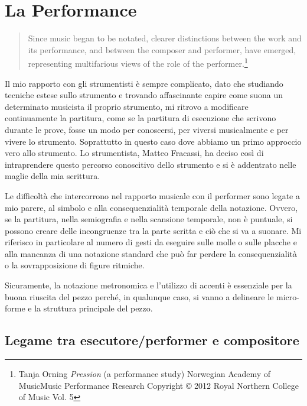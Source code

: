 
\chapter{La Performance}
\label{chp:La Performance}

\begin{quotation}
Since music began to be notated, clearer distinctions between the work and its performance, and between the composer and performer, have emerged, representing multifarious views of the role of the performer.\footnote{Tanja Orning \textit{Pression} (a performance study) Norwegian Academy of MusicMusic Performance Research Copyright © 2012 Royal Northern College of Music Vol. 5}
\end{quotation}

Il mio rapporto con gli strumentisti è sempre complicato, dato che studiando tecniche estese sullo strumento e trovando affascinante capire come suona un determinato musicista il proprio strumento, mi ritrovo a modificare continuamente la partitura, come se la partitura di esecuzione che scrivono durante le prove, fosse un modo per conoscersi, per viversi musicalmente e per vivere lo strumento. Soprattutto in questo caso dove abbiamo un primo approccio vero allo strumento. Lo strumentista, Matteo Fracassi, ha deciso così di intraprendere questo percorso conoscitivo dello strumento e si è addentrato nelle maglie della mia scrittura.

 Le difficoltà che intercorrono nel rapporto musicale con il performer sono legate a mio parere, al simbolo e alla consequenzialità temporale della notazione. Ovvero, se la partitura, nella semiografia e nella scansione temporale, non è puntuale, si possono creare delle incongruenze tra la parte scritta e ciò che si va a suonare. Mi riferisco in particolare al numero di gesti da eseguire sulle molle o sulle placche e alla mancanza di una notazione standard che può far perdere la consequenzialità o la sovrapposizione di figure ritmiche.

Sicuramente, la notazione metronomica e l'utilizzo di accenti è essenziale per la buona riuscita del pezzo perché, in qualunque caso, si vanno a delineare le micro-forme e la struttura principale del pezzo.



\section{Legame tra esecutore/performer e compositore}


